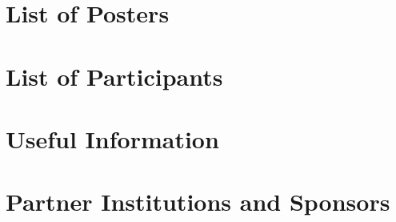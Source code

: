 \documentclass[openany, parskip=full, 12pt, a4]{scrbook}
\begin{document}


\chapter{List of Posters} 

\vspace{-2.5em}





\chapter{List of Participants}
 

 
\chapter{Useful Information}



\chapter{Partner Institutions and Sponsors}



\newpage


\thispagestyle{empty}
\mbox{}
\end{document}
